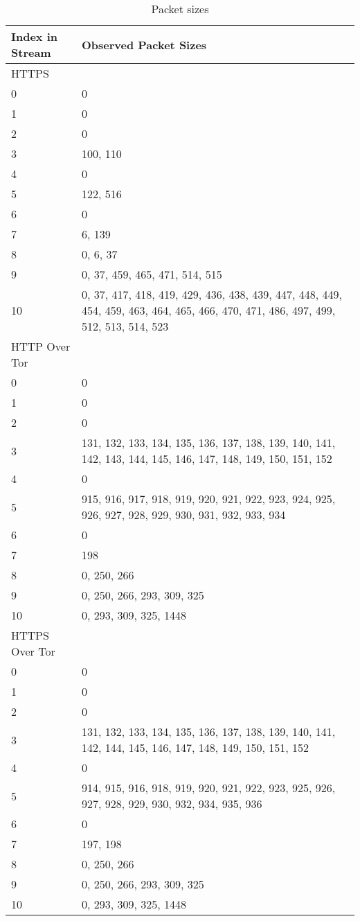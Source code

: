 \begin{table}[H]
  \begin{tabular}{lp{14cm}}
    \toprule
    Index in Stream & Observed Packet Sizes\\
    \midrule
    HTTPS\\
    \midrule
    0 & 0\\
    1 & 0\\
    2 & 0\\
    3 & 100, 110\\
    4 & 0\\
    5 & 122, 516\\
    6 & 0\\
    7 & 6, 139\\
    8 & 0, 6, 37\\
    9 & 0, 37, 459, 465, 471, 514, 515\\
    10 & 0, 37, 417, 418, 419, 429, 436, 438, 439, 447, 448, 449, 454, 459, 463, 464, 465, 466, 470, 471, 486, 497, 499, 512, 513, 514, 523\\
    \midrule
    HTTP Over Tor\\
    \midrule
    0 & 0\\
    1 & 0\\
    2 & 0\\
    3 & 131, 132, 133, 134, 135, 136, 137, 138, 139, 140, 141, 142, 143, 144, 145, 146, 147, 148, 149, 150, 151, 152\\
    4 & 0\\
    5 & 915, 916, 917, 918, 919, 920, 921, 922, 923, 924, 925, 926, 927, 928, 929, 930, 931, 932, 933, 934\\
    6 & 0\\
    7 & 198\\
    8 & 0, 250, 266\\
    9 & 0, 250, 266, 293, 309, 325\\
    10 & 0, 293, 309, 325, 1448\\
    \midrule
    HTTPS Over Tor\\
    \midrule
    0 & 0\\
    1 & 0\\
    2 & 0\\
    3 & 131, 132, 133, 134, 135, 136, 137, 138, 139, 140, 141, 142, 144, 145, 146, 147, 148, 149, 150, 151, 152\\
    4 & 0\\
    5 & 914, 915, 916, 918, 919, 920, 921, 922, 923, 925, 926, 927, 928, 929, 930, 932, 934, 935, 936\\
    6 & 0\\
    7 & 197, 198\\
    8 & 0, 250, 266\\
    9 & 0, 250, 266, 293, 309, 325\\
    10 & 0, 293, 309, 325, 1448\\
    \bottomrule
  \end{tabular}
  \caption{Packet sizes}
  \label{table:packet_sizes}
\end{table}

